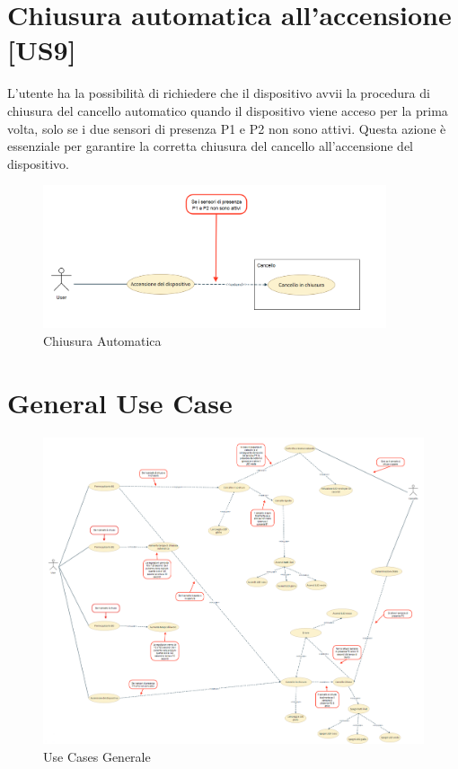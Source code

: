 \section{Chiusura automatica all'accensione [US9]}
L'utente ha la possibilità di richiedere che il dispositivo avvii la procedura di chiusura del cancello automatico quando il dispositivo viene acceso per la prima volta, solo se i due sensori di presenza P1 e P2 non sono attivi. Questa azione è essenziale per garantire la corretta chiusura del cancello all'accensione del dispositivo.


\begin{figure}[H]
    \centering
    \includegraphics[width=0.9\textwidth]{figures/usecase_9.png}
    \caption{Chiusura Automatica}
    \label{usecase9}
\end{figure}


\section{General Use Case}
\begin{figure}[H]
    \centering
    \includegraphics[width=1\linewidth]{figures/generalusecases.png}
    \caption{Use Cases Generale}
    \label{general}
\end{figure}